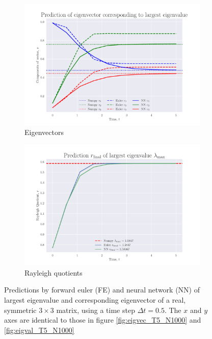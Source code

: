 \documentclass[12pt]{extarticle}
\begin{document}
\begin{figure}[h]
	
	\centering
	\begin{subfigure}{0.49\textwidth}
		\centering
		\includegraphics[width=\textwidth]{../output/plots/eigvec_T5_N10.pdf}
		\caption{Eigenvectors}
		\label{fig:eigvec_T5_N10}
	\end{subfigure}
	\hfill
	\begin{subfigure}{0.49\textwidth}
		\centering
		\includegraphics[width=\textwidth]{../output/plots/eigval_T5_N10.pdf}
		\caption{Rayleigh quotients}
		\label{fig:eigval_T5_N10}
	\end{subfigure}
	\caption{Predictions by forward euler (FE) and neural network (NN) of largest eigenvalue and corresponding eigenvector of a real, symmetric $3\times 3$ matrix, using a time step $\Delta t = 0.5$. The $x$ and $y$ axes are identical to those in figure \ref{fig:eigvec_T5_N1000} and \ref{fig:eigval_T5_N1000}}
	\label{fig:eig_T5_N10}
\end{figure}
\end{document}
